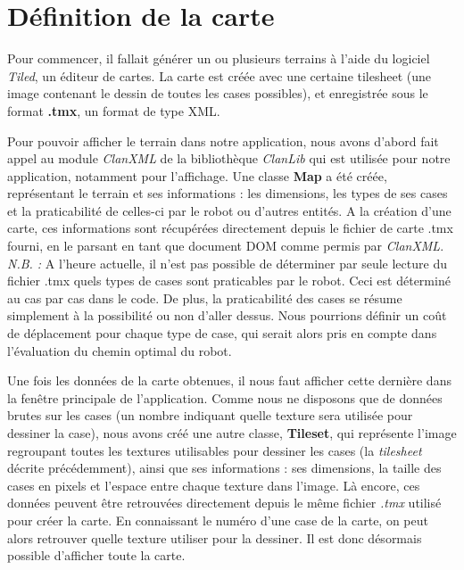 \documentclass[a4paper 12pts]{article}
\begin{document}
\newpage

\section{Définition de la carte}
\vspace{1cm}
Pour commencer, il fallait générer un ou plusieurs terrains à l'aide du logiciel \emph{Tiled}, un éditeur de cartes. La carte est créée avec une certaine tilesheet (une image contenant le dessin de toutes les cases possibles), et enregistrée sous le format \textbf{.tmx}, un format de type XML.

Pour pouvoir afficher le terrain dans notre application, nous avons d'abord fait appel au module \emph{ClanXML} de la bibliothèque \emph{ClanLib} qui est utilisée pour notre application, notamment pour l'affichage. Une classe \textbf{Map} a été créée, représentant le terrain et ses informations : les dimensions, les types de ses cases et la praticabilité de celles-ci par le robot ou d'autres entités. A la création d'une carte, ces informations sont récupérées directement depuis le fichier de carte .tmx fourni, en le parsant en tant que document DOM comme permis par \emph{ClanXML}. \\
\emph{N.B. :} A l'heure actuelle, il n'est pas possible de déterminer par seule lecture du fichier .tmx quels types de cases sont praticables par le robot. Ceci est déterminé au cas par cas dans le code. De plus, la praticabilité des cases se résume simplement à la possibilité ou non d'aller dessus. Nous pourrions définir un coût de déplacement pour chaque type de case, qui serait alors pris en compte dans l'évaluation du chemin optimal du robot.

Une fois les données de la carte obtenues, il nous faut afficher cette dernière dans la fenêtre principale de l'application. Comme nous ne disposons que de données brutes sur les cases (un nombre indiquant quelle texture sera utilisée pour dessiner la case), nous avons créé une autre classe, \textbf{Tileset}, qui représente l'image regroupant toutes les textures utilisables pour dessiner les cases (la \emph{tilesheet} décrite précédemment), ainsi que ses informations : ses dimensions, la taille des cases en pixels et l'espace entre chaque texture dans l'image. Là encore, ces données peuvent être retrouvées directement depuis le même fichier \emph{.tmx} utilisé pour créer la carte.
En connaissant le numéro d'une case de la carte, on peut alors retrouver quelle texture utiliser pour la dessiner. Il est donc désormais possible d'afficher toute la carte.
\end{document}
